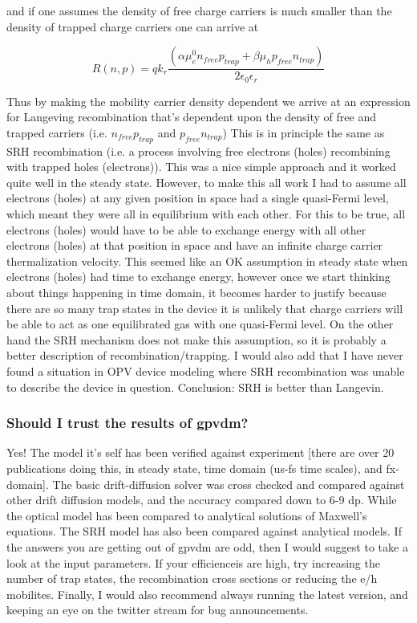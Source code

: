 \documentclass[11pt]{article}
\begin{document}
and if one assumes the density of free charge carriers is much smaller than the density of trapped charge carriers one can arrive at

\begin{equation}
R(n,p)=q k_{r}\frac{(\alpha \mu_e^0 n_{free} p_{trap}+\beta \mu_h p_{free} n_{trap}) }{2\epsilon_0\epsilon_r}
\end{equation}

Thus by making the mobility carrier density dependent we arrive at an expression for Langeving recombination that's dependent upon the density of free and trapped carriers (i.e. $n_{free} p_{trap}$ and $ p_{free} n_{trap}$) This is in principle the same as SRH recombination (i.e. a process involving free electrons (holes) recombining with trapped holes (electrons)).  This was a nice simple approach and it worked quite well in the steady state.  However, to make this all work I had to assume all electrons (holes) at any given position in space had a single quasi-Fermi level, which meant they were all in equilibrium with each other.  For this to be true, all electrons (holes) would have to be able to exchange energy with all other electrons (holes) at that position in space and have an infinite charge carrier thermalization velocity.  This seemed like an OK assumption in steady state when electrons (holes) had time to exchange energy, however once we start thinking about things happening in time domain, it becomes harder to justify because there are so many trap states in the device it is unlikely that charge carriers will be able to act as one equilibrated gas with one quasi-Fermi level.  On the other hand the SRH mechanism does not make this assumption, so it is probably a better description of recombination/trapping.  I would also add that I have never found a situation in OPV device modeling where SRH recombination was unable to describe the device in question.  Conclusion: SRH is better than Langevin.  


\subsubsection{Should I trust the results of gpvdm?}
Yes!  The model it's self has been verified against experiment [there are over 20 publications doing this, in steady state, time domain (us-fs time scales), and fx-domain]. The basic drift-diffusion solver was cross checked and compared against other drift diffusion models, and the accuracy compared down to 6-9 dp.  While the optical model has been compared to analytical solutions of Maxwell's equations.  The SRH model has also been compared against analytical models.  If the answers you are getting out of gpvdm are odd, then I would suggest to take a look at the input parameters.  If your efficienceis are high, try increasing the number of trap states, the recombination cross sections or reducing the e/h mobilites.  Finally, I would also recommend always running the latest version, and keeping an eye on the twitter stream for bug announcements.
\end{document}
